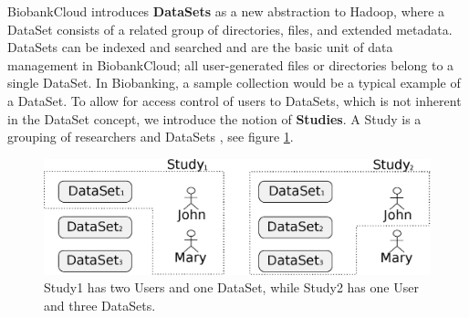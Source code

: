 BiobankCloud introduces \textbf{DataSets} as a new abstraction to Hadoop, where a DataSet consists of a related group of directories, files, and extended metadata. DataSets can be indexed and searched and are the basic unit of data management in BiobankCloud; all user-generated files or directories belong to a single DataSet. In Biobanking, a sample collection would be a typical example of a DataSet.  To allow for access control of users to DataSets, which is not inherent in the DataSet concept, we introduce the notion of \textbf{Studies}. A Study is a grouping of researchers and DataSets , see figure \ref{fig:studies}. 
\begin{figure}[h]
 \centering
 \includegraphics[scale=0.6]{./imgs/projects-as-groupings1.eps}
\caption{Study1 has two Users and one DataSet, while Study2 has one User and three DataSets.}
\label{fig:studies}
\end{figure}
